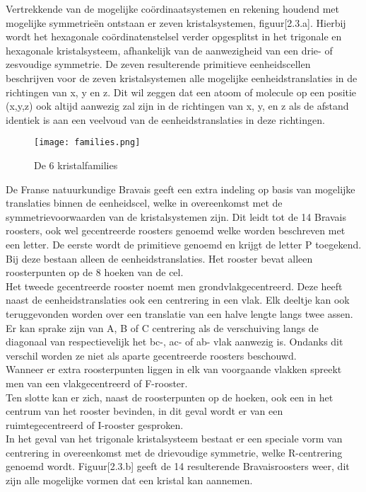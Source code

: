 \par 
Vertrekkende van de mogelijke coördinaatsystemen en rekening houdend met mogelijke symmetrieën ontstaan er zeven kristalsystemen, figuur[2.3.a]. Hierbij wordt het hexagonale coördinatenstelsel verder opgesplitst in het trigonale en hexagonale kristalsysteem, afhankelijk van de aanwezigheid van een drie- of zesvoudige symmetrie. De zeven resulterende primitieve eenheidscellen beschrijven  voor de zeven kristalsystemen alle mogelijke eenheidstranslaties in de richtingen van x, y en z. Dit wil zeggen dat een atoom of molecule op een positie (x,y,z) ook altijd
 aanwezig zal zijn in de richtingen van x, y, en z als de afstand identiek is aan een veelvoud van de eenheidstranslaties in deze richtingen.

\begin{figure}[H]
\texttt{[image: families.png]}
\caption{De 6 kristalfamilies}
\end{figure}

\par   
De Franse natuurkundige Bravais \citep*{BRAV} geeft een extra indeling op basis van mogelijke translaties binnen de eenheidscel, welke in overeenkomst met de symmetrievoorwaarden van de kristalsystemen zijn. Dit leidt tot de 14 Bravais roosters, ook wel gecentreerde roosters genoemd welke worden beschreven met een letter. 
De eerste wordt de primitieve genoemd en krijgt de letter P toegekend. Bij deze bestaan alleen de eenheidstranslaties. Het rooster bevat alleen roosterpunten op de 8 hoeken van de cel.
\\
Het tweede gecentreerde rooster noemt men grondvlakgecentreerd. Deze heeft naast de eenheidstranslaties ook een centrering in een vlak. Elk deeltje kan ook teruggevonden worden over een translatie van een halve lengte langs twee assen. Er kan sprake zijn van A, B of C centrering als de verschuiving langs de diagonaal van respectievelijk het bc-, ac- of ab- vlak aanwezig is. Ondanks dit verschil worden ze niet als aparte gecentreerde roosters beschouwd.   
\\
Wanneer er extra roosterpunten liggen in elk van voorgaande vlakken spreekt men van een vlakgecentreerd of F-rooster. 
\\
Ten slotte kan er zich, naast de roosterpunten op de hoeken, ook een in het centrum van het rooster bevinden, in dit geval wordt er van een ruimtegecentreerd of I-rooster gesproken. 
\\
In het geval van het trigonale kristalsysteem bestaat er een speciale vorm van centrering in overeenkomst met de drievoudige symmetrie, welke R-centrering genoemd wordt. Figuur[2.3.b] geeft de 14 resulterende Bravaisroosters weer, dit zijn alle mogelijke vormen dat een kristal kan aannemen.
 
